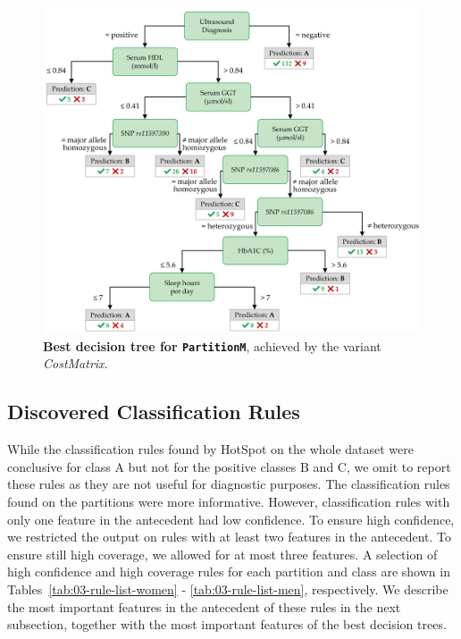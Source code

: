 \documentclass[
  oneside]{book}
\begin{document}
\begin{figure}[htb]

{\centering \includegraphics[width=1\linewidth]{figures/03-tree-men} 

}

\caption{\textbf{Best decision tree for \texttt{PartitionM}}, achieved by the variant \emph{CostMatrix}.}\label{fig:03-tree-men}
\end{figure}

\hypertarget{imm-experiments-rules}{%
\subsection{Discovered Classification Rules}\label{imm-experiments-rules}}

While the classification rules found by HotSpot on the whole dataset were conclusive for class A but not for the positive classes B and C, we omit to report these rules as they are not useful for diagnostic purposes.
The classification rules found on the partitions were more informative.
However, classification rules with only one feature in the antecedent had low confidence.
To ensure high confidence, we restricted the output on rules with at least two features in the antecedent.
To ensure still high coverage, we allowed for at most three features.
A selection of high confidence and high coverage rules for each partition and class are shown in Tables~\ref{tab:03-rule-list-women} - \ref{tab:03-rule-list-men}, respectively.
We describe the most important features in the antecedent of these rules in the next subsection, together with the most important features of the best decision trees.
\end{document}
